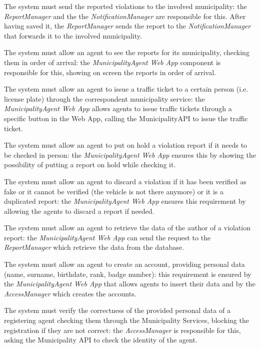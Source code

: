 \documentclass[a4paper]{report}
\begin{document}
\begin{enumerate}[start=1,label={[R\arabic*]}]
\item \label{[R18]}The system must send the reported violations to the involved municipality: the \textit{ReportManager} and the the \textit{NotificationManager} are responsible for this. After having saved it, the \textit{ReportManager} sends the report to the \textit{NotificationManager} that forwards it to the involved municipality.
\item \label{[R19]}The system must allow an agent to see the reports for its municipality, checking them in order of arrival: the \textit{MunicipalityAgent Web App} component is responsible for this, showing on screen the reports in order of arrival.
\item \label{[R20]}The system must allow an agent to issue a traffic ticket to a certain person (i.e. license plate) through the correspondent municipality service: the \textit{MunicipalityAgent Web App}  allows agents to issue traffic tickets through a specific button in the Web App, calling the MunicipalityAPI to issue the traffic ticket.
\item \label{[R21]}The system must allow an agent to put on hold a violation report if it needs to be checked in person: the \textit{MunicipalityAgent Web App} ensures this by showing the possibility of putting a report on hold while checking it.
\item \label{[R22]}The system must allow an agent to discard a violation if it has been verified as fake or it cannot be verified (the vehicle is not there anymore) or it is a duplicated report: the \textit{MunicipalityAgent Web App} ensures this requirement by allowing the agents to discard a report if needed.
\item \label{[R23]}The system must allow an agent to retrieve the data of the author of a violation report: the \textit{MunicipalityAgent Web App} can send the request to the \textit{ReportManager}  which retrieve the data from the database.
\item \label{[R24]}The system must allow an agent to create an account, providing personal data (name, surname, birthdate, rank, badge number): this requirement is ensured by the \textit{MunicipalityAgent Web App} that allows agents to insert their data and by the \textit{AccessManager} which creates the accounts.
\item \label{[R25]}The system must verify the correctness of the provided personal data of a registering agent checking them through the Municipality Services, blocking the registration if they are not correct: the \textit{AccessManager} is responsible for this, asking the Municipality API to check the identity of the agent.

\end{enumerate}
\end{document}
